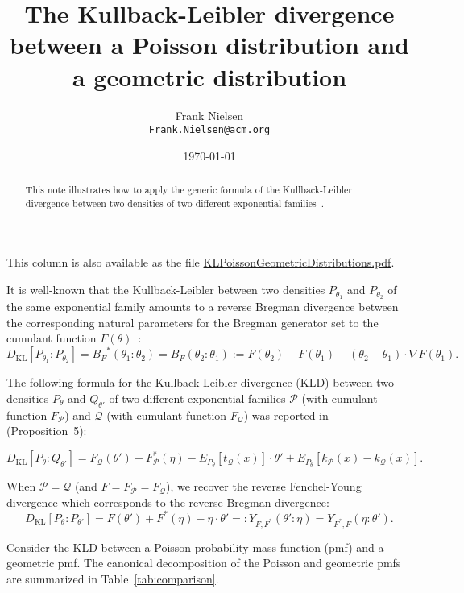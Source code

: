 \documentclass{article}
\title{The Kullback-Leibler divergence between a Poisson distribution and a geometric distribution}
\author{Frank Nielsen\\ {\tt Frank.Nielsen@acm.org}}
\date{\today}
\def\calP{\mathcal{P}}
\def\calQ{\mathcal{Q}}
\def\KL{\mathrm{KL}}
\begin{document}
\maketitle

\begin{abstract}
This note illustrates how to apply the generic formula of the Kullback-Leibler divergence between two densities of two different exponential families~\cite{nielsen2021variational}.
\end{abstract}

This column is also available as the file \url{KLPoissonGeometricDistributions.pdf}.\vskip 0.3cm


It is well-known that the Kullback-Leibler between two densities $P_{\theta_1}$ and $P_{\theta_2}$ of the same exponential family amounts to a reverse Bregman divergence between the corresponding natural parameters for the Bregman generator set to the cumulant function $F(\theta)$~\cite{banerjee2005clustering}:
$$
D_\KL[P_{\theta_1}:P_{\theta_2}] = {B_F}^*(\theta_1:\theta_2)= B_F(\theta_2:\theta_1):=F(\theta_2)-F(\theta_1)-(\theta_2-\theta_1)\cdot \nabla F(\theta_1). 
$$

The following formula for the Kullback-Leibler divergence (KLD) between two densities $P_{\theta}$ and $Q_{\theta'}$ of two different exponential families $\calP$ (with cumulant function $F_\calP$) and $\calQ$ (with cumulant function $F_\calQ$) was reported in~\cite{nielsen2021variational} (Proposition~5):

\begin{equation}
D_\KL[P_{\theta}:Q_{\theta'}] = 
F_\calQ(\theta')+F_\calP^*(\eta)-E_{P_{\theta}}[t_\calQ(x)]\cdot\theta' +E_{P_{\theta}}[k_\calP(x)-k_\calQ(x)].
\end{equation}

When $\calP=\calQ$ (and $F=F_\calP=F_\calQ$), we recover the reverse Fenchel-Young divergence which corresponds to the reverse Bregman divergence:
$$
D_\KL[P_{\theta}:P_{\theta'}]=F(\theta')+F^*(\eta)-\eta\cdot\theta'=:Y_{F,F^*}(\theta':\eta)=Y_{F^*,F}(\eta:\theta').
$$

Consider the KLD between a Poisson probability mass function (pmf) and a geometric pmf.
The canonical decomposition of the Poisson and geometric pmfs are summarized in Table~\ref{tab:comparison}.
\end{document}
